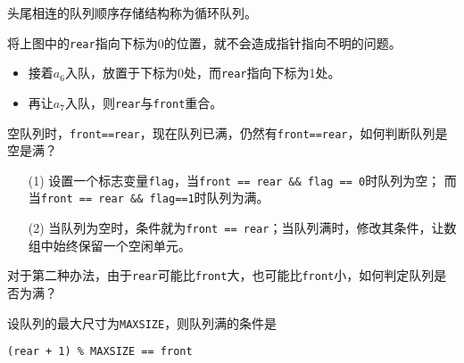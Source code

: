 \begin{frame}\ft{\subsecname}
\begin{dingyi}
头尾相连的队列顺序存储结构称为循环队列。
\end{dingyi}
\end{frame}
%
%
\begin{frame}\ft{\subsecname}
将上图中的{\tt rear}指向下标为0的位置，就不会造成指针指向不明的问题。
  
\end{frame}

\begin{frame}\ft{\subsecname}

\pause

\begin{itemize}
\item 接着$a_6$入队，放置于下标为0处，而{\tt rear}指向下标为1处。\\[0.1in]
\item 再让$a_7$入队，则{\tt rear}与{\tt front}重合。
\end{itemize}

\end{frame}

\begin{frame}\ft{\subsecname}
\begin{wenti}
空队列时，{\tt front==rear}，现在队列已满，仍然有{\tt front==rear}，如何判断队列是空是满？
\end{wenti}
\pause 
\begin{itemize}
\item[(1)] 设置一个标志变量{\tt flag}，当{\tt front == rear \&\& flag == 0}时队列为空；
而当{\tt front == rear \&\& flag==1}时队列为满。\\[0.1in]
\pause 
\item[(2)] 当队列为空时，条件就为{\tt front == rear}；当队列满时，修改其条件，让数组中始终保留一个空闲单元。
\end{itemize}
\end{frame}

\begin{frame}\ft{\subsecname}
  
\end{frame}

\begin{frame}[fragile]\ft{\subsecname}
\begin{wenti}
对于第二种办法，由于{\tt rear}可能比{\tt front}大，也可能比{\tt front}小，如何判定队列是否为满？
\end{wenti}
\vspace{0.1in}\pause 

设队列的最大尺寸为{\tt MAXSIZE}，则队列满的条件是

{\tt (rear + 1) \% MAXSIZE == front}

\end{frame}

